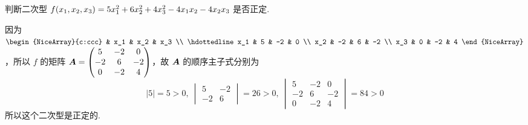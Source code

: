 \begin{example}
    判断二次型 $f\qty(x_1,x_2,x_3)=5x_1^2+6x_2^2+4x_3^2-4x_1x_2-4x_2x_3$ 是否正定.
\end{example}
\begin{solution}
    因为 $\begin{NiceArray}{c:ccc}
        & x_1 & x_2 & x_3 \\ \hdottedline
            x_1 & 5   & -2  & 0   \\
            x_2 & -2  & 6   & -2  \\
            x_3 & 0   & -2  & 4
    \end{NiceArray}$，所以 $f$ 的矩阵 $\vb*{A}=\begin{pmatrix}
            5  & -2 & 0  \\
            -2 & 6  & -2 \\
            0  & -2 & 4
        \end{pmatrix}$，故 $\vb*{A}$ 的顺序主子式分别为
    $$|5|=5>0,~\begin{vmatrix}
            5  & -2 \\
            -2 & 6
        \end{vmatrix}=26>0,~\begin{vmatrix}
            5  & -2 & 0  \\
            -2 & 6  & -2 \\
            0  & -2 & 4
        \end{vmatrix}=84>0$$
    所以这个二次型是正定的.
\end{solution}

